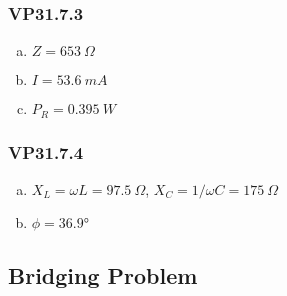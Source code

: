 \documentclass{article}
\begin{document}
\subsubsection{VP31.7.3}

\begin{enumerate}[(a)]
  \item $Z = \qty{653}{\Omega}$

  \item $I = \qty{53.6}{mA}$

  \item $P_R = \qty{0.395}{W}$
\end{enumerate}

\subsubsection{VP31.7.4}

\begin{enumerate}[(a)]
  \item $X_L = \omega L = \qty{97.5}{\Omega}$, $X_C = 1 / \omega C = \qty{175}{\Omega}$

  \item $\phi = \ang{36.9}$
\end{enumerate}

\subsection{Bridging Problem}
\end{document}
